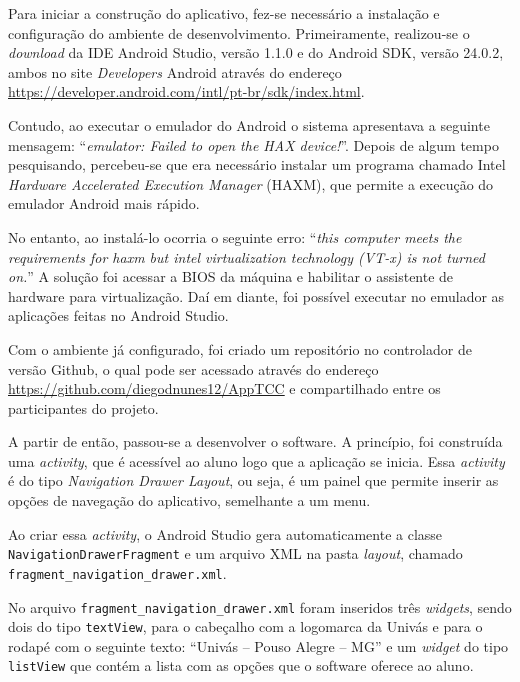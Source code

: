 	\par Para iniciar a construção do aplicativo, fez-se necessário a instalação e
configuração do ambiente de desenvolvimento. Primeiramente, realizou-se o
\textit{download} da IDE Android Studio, versão 1.1.0 e do Android SDK, versão
24.0.2, ambos no site \textit{Developers} Android através do endereço
\url{https://developer.android.com/intl/pt-br/sdk/index.html}.

	\par Contudo, ao executar o emulador do Android o sistema apresentava a
seguinte mensagem: “\textit{emulator: Failed to open the HAX device!}”. Depois
de algum tempo pesquisando, percebeu-se que era necessário instalar um programa
chamado Intel \textit{Hardware Accelerated Execution Manager} (HAXM), que
permite a execução do emulador Android mais rápido.

	\par No entanto, ao instalá-lo ocorria o seguinte erro: “\textit{this computer
meets the requirements for haxm but intel virtualization technology (VT-x) is
not turned on.}” A solução foi acessar a BIOS da máquina e habilitar o
assistente de hardware para virtualização. Daí em diante, foi possível executar
no emulador as aplicações feitas no Android Studio.

	\par Com o ambiente já configurado, foi criado um repositório no controlador de
versão Github, o qual pode ser acessado através do endereço
\url{https://github.com/diegodnunes12/AppTCC} e compartilhado entre os
participantes do projeto.

	\par A partir de então, passou-se a desenvolver o software. A princípio, foi
construída uma \textit{activity}, que é acessível ao aluno logo que a aplicação
se inicia. Essa \textit{activity} é do tipo \textit{Navigation Drawer Layout},
ou seja, é um painel que permite inserir as opções de navegação do aplicativo,
semelhante a um menu.

	\par Ao criar essa \textit{activity}, o Android Studio gera automaticamente a
classe \texttt{NavigationDrawerFragment} e um arquivo XML na pasta
\textit{layout}, chamado \texttt{fragment\_navigation\_drawer.xml}.

	\par No arquivo \texttt{fragment\_navigation\_drawer.xml} foram inseridos três
\textit{widgets}, sendo dois do tipo \texttt{textView}, para o cabeçalho com a
logomarca da Univás e para o rodapé com o seguinte texto: “Univás – Pouso
Alegre – MG” e um \textit{widget} do tipo \texttt{listView} que contém a lista
com as opções que o software oferece ao aluno.

